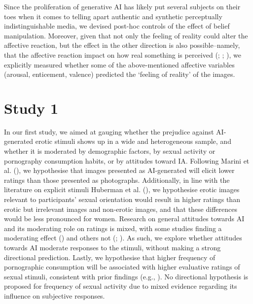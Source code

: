 \documentclass[
  jou,
  floatsintext,
  longtable,
  nolmodern,
  notxfonts,
  notimes,
  colorlinks=true,linkcolor=blue,citecolor=blue,urlcolor=blue]{apa7}
\begin{document}
Since the proliferation of generative AI has likely put several subjects
on their toes when it comes to telling apart authentic and synthetic
perceptually indistinguishable media, we devised post-hoc controls of
the effect of belief manipulation. Moreover, given that not only the
feeling of reality could alter the affective reaction, but the effect in
the other direction is also possible--namely, that the affective
reaction impact on how real something is perceived
(; ;
), we
explicitly measured whether some of the above-mentioned affective
variables (arousal, enticement, valence) predicted the `feeling of
reality' of the images.

\section{Study 1}\label{study-1}

In our first study, we aimed at gauging whether the prejudice against
AI-generated erotic stimuli shows up in a wide and heterogeneous sample,
and whether it is moderated by demographic factors, by sexual activity
or pornography consumption habits, or by attitudes toward IA. Following
Marini et al. (), we hypothesise that
images presented as AI-generated will elicit lower ratings than those
presented as photographs. Additionally, in line with the literature on
explicit stimuli Huberman et al.
(), we hypothesise erotic images
relevant to participants' sexual orientation would result in higher
ratings than erotic but irrelevant images and non-erotic images, and
that these differences would be less pronounced for women. Research on
general attitudes towards AI and its moderating role on ratings is
mixed, with some studies finding a moderating effect
() and others not
(;
). As such, we explore
whether attitudes towards AI moderate responses to the stimuli, without
making a strong directional prediction. Lastly, we hypothesise that
higher frequency of pornographic consumption will be associated with
higher evaluative ratings of sexual stimuli, consistent with prior
findings (e.g., ). No directional hypothesis is proposed for frequency of sexual
activity due to mixed evidence regarding its influence on subjective
responses.
\end{document}
